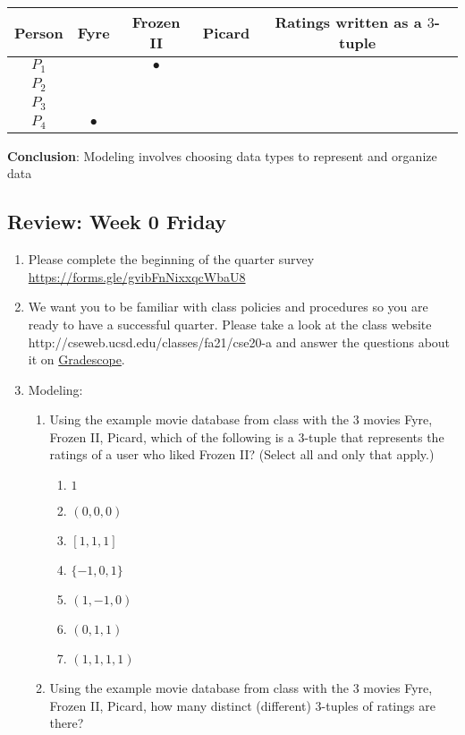\documentclass[12pt, oneside]{article}
\newcommand{\cmark}{\ding{51}}
\newcommand{\xmark}{\ding{55}}
\begin{document}
\begin{center}
\begin{tabular}{c|ccc||c}
Person & Fyre & Frozen II & Picard & Ratings written as a  $3$-tuple\\
\hline
$P_1$     & \xmark & $\bullet$ & \cmark & \phantom{$(-1, 0, 1)$} \\
$P_2$     & \cmark & \cmark & \xmark & \phantom{$(1, 1, -1)$} \\
$P_3$     & \cmark & \cmark & \cmark & \phantom{$(1, 1, 1)$} \\
$P_4$     & $\bullet$ & \xmark & \cmark &  \\
\end{tabular}
\end{center} 
{\bf Conclusion}: Modeling involves choosing data types to represent and organize data

\newpage
\subsection*{Review: Week 0 Friday}
\begin{enumerate}
\item Please complete the beginning of the quarter survey \href{https://forms.gle/gvibFnNixxqcWbaU8}{https://forms.gle/gvibFnNixxqcWbaU8}
\item We want you to be familiar with class policies and procedures so you are ready to have a successful quarter. 
Please take a look at the class website http://cseweb.ucsd.edu/classes/fa21/cse20-a
and answer the questions about it on \href{http://gradescope.com}{Gradescope}.
\item Modeling: 
\begin{enumerate}
    \item {

Using the example movie database from class with the $3$ movies Fyre, Frozen II, Picard, 
which of the following is a $3$-tuple that represents the ratings of a user who liked
Frozen II? (Select all and only that apply.)

\begin{enumerate}
\item $1$
\item $(0,0,0)$
\item $[1,1,1]$
\item $\{-1, 0, 1\}$
\item $(1,-1,0)$
\item $(0,1,1)$
\item $(1,1,1,1)$
\end{enumerate} }
    \item {

Using the example movie database from class with the $3$ movies Fyre, Frozen II, Picard, 
how many distinct (different) $3$-tuples of ratings are there? 
 }
\end{enumerate}
\end{enumerate}
\newpage
\end{document}
